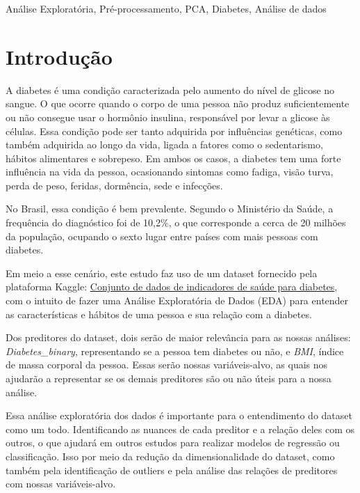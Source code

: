 \documentclass[conference]{IEEEtran}
\begin{document}
\begin{IEEEkeywords}
Análise Exploratória, Pré-processamento, PCA, Diabetes, Análise de dados
\end{IEEEkeywords}

\section{Introdução}

A diabetes é uma condição caracterizada pelo aumento do nível de glicose no sangue. O que ocorre quando o corpo de uma pessoa não produz suficientemente ou não consegue usar o hormônio insulina, responsável por levar a glicose às células.
Essa condição pode ser tanto adquirida por influências genéticas, como também adquirida ao longo da vida, ligada a fatores como o sedentarismo, hábitos alimentares e sobrepeso.
Em ambos os casos, a diabetes tem uma forte influência na vida da pessoa, ocasionando sintomas como fadiga, visão turva, perda de peso, feridas, dormência, sede e infecções.

No Brasil, essa condição é bem prevalente. Segundo o Ministério da Saúde, a frequência do diagnóstico foi de 10,2\%, o que corresponde a cerca de 20 milhões da população, ocupando o sexto lugar entre países com mais pessoas com diabetes.

Em meio a esse cenário, este estudo faz uso de um dataset fornecido pela plataforma Kaggle: 
\href{https://www.kaggle.com/datasets/alexteboul/diabetes-health-indicators-dataset/data?select=diabetes_binary_5050split_health_indicators_BRFSS2015.csv}{Conjunto de dados de indicadores de saúde para diabetes},
com o intuito de fazer uma Análise Exploratória de Dados (EDA) para entender as características e hábitos de uma pessoa e sua relação com a diabetes.

Dos preditores do dataset, dois serão de maior relevância para as nossas análises: \textit{Diabetes\_binary}, representando se a pessoa tem diabetes ou não, e \textit{BMI}, 
índice de massa corporal da pessoa. Essas serão nossas variáveis-alvo, as quais nos ajudarão a representar se os demais preditores são ou não úteis para a nossa análise.

Essa análise exploratória dos dados é importante para o entendimento do dataset como um todo. Identificando as nuances de cada preditor e a relação deles com os outros, o que ajudará em outros estudos para realizar modelos de regressão ou classificação. Isso por meio da redução da dimensionalidade do dataset, como também pela identificação de outliers e pela análise das relações de preditores com nossas variáveis-alvo.
\end{document}
